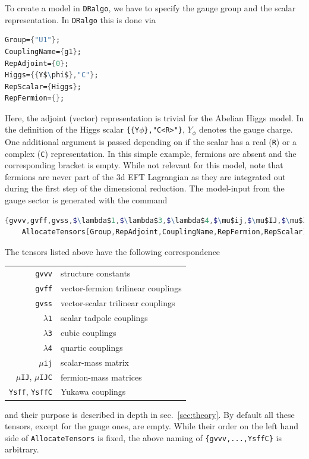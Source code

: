 \documentclass[11pt]{article}
\def\dralgo{{\tt DRalgo}}
\begin{document}
To create a model in \dralgo{}, we have to specify the gauge group and the scalar representation.
In \dralgo{} this is done via
\begin{lstlisting}[language=Mathematica,mathescape=true]
Group={"U1"};
CouplingName={g1};
RepAdjoint={0};
Higgs={{Y$\phi$},"C"};
RepScalar={Higgs}; 
RepFermion={};
\end{lstlisting}
Here,
the adjoint (vector) representation is trivial for the Abelian Higgs model.
In the definition of the Higgs scalar
{\verb!{{Y!$\phi$\verb!},"C<R>"}!},
$Y_\phi$ denotes the gauge charge.
One additional argument is passed depending on if the scalar has
a real ({\tt R}) or
a complex ({\tt C}) representation.
In this simple example, fermions are absent and
the corresponding bracket is empty. 
While not relevant for this model, note that fermions are never part of the 3d EFT Lagrangian as they are integrated out
during the first step of the dimensional reduction.
%
The model-input from the gauge sector is generated with the command
\begin{lstlisting}[language=Mathematica,mathescape=true]
{gvvv,gvff,gvss,$\lambda$1,$\lambda$3,$\lambda$4,$\mu$ij,$\mu$IJ,$\mu$IJC,Ysff,YsffC}=
    AllocateTensors[Group,RepAdjoint,CouplingName,RepFermion,RepScalar];
\end{lstlisting}
The tensors listed above have the following correspondence
\begin{center}
\begin{tabular}{ r l } 
  {\tt gvvv} & structure constants \\ 
  {\tt gvff} & vector-fermion trilinear couplings \\
  {\tt gvss} & vector-scalar trilinear couplings \\ 
  {\tt $\lambda$1} & scalar tadpole couplings \\
  {\tt $\lambda$3} & cubic couplings \\
  {\tt $\lambda$4} & quartic couplings \\
  {\tt $\mu$ij} & scalar-mass matrix \\
  {\tt $\mu$IJ}, 
  {\tt $\mu$IJC} & fermion-mass matrices \\ 
  {\tt Ysff}, 
  {\tt YsffC} & Yukawa couplings 
\end{tabular}
\end{center}
and their purpose is described in depth in sec.~\ref{sec:theory}. 
By default all these tensors, except for the gauge ones, are empty.
While their order on the left hand side of
{\tt AllocateTensors} is fixed,
the above naming of {\verb!{gvvv,...,YsffC}!}
is arbitrary.
\end{document}
